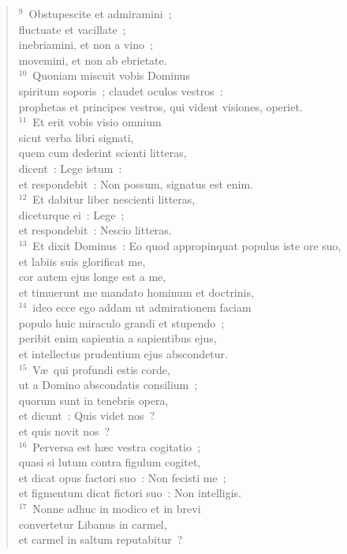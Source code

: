 \begin{flushleft}
\begin{verse}
${}^{9}$~Obstupescite et admiramini~;\\ fluctuate et vacillate~;\\ inebriamini, et non a vino~;\\ movemini, et non ab ebrietate.\\
${}^{10}$~Quoniam miscuit vobis Dominus\\ spiritum soporis~; claudet oculos vestros~:\\ prophetas et principes vestros, qui vident visiones, operiet.\\
${}^{11}$~Et erit vobis visio omnium\\ sicut verba libri signati,\\ quem cum dederint scienti litteras,\\ dicent~: Lege istum~:\\ et respondebit~: Non possum, signatus est enim.\\
${}^{12}$~Et dabitur liber nescienti litteras,\\ diceturque ei~: Lege~;\\ et respondebit~: Nescio litteras.\\
${}^{13}$~Et dixit Dominus~: Eo quod appropinquat populus iste ore suo,\\ et labiis suis glorificat me,\\ cor autem ejus longe est a me,\\ et timuerunt me mandato hominum et doctrinis,\\
${}^{14}$~ideo ecce ego addam ut admirationem faciam\\ populo huic miraculo grandi et stupendo~;\\ peribit enim sapientia a sapientibus ejus,\\ et intellectus prudentium ejus abscondetur.\\
${}^{15}$~V\ae\ qui profundi estis corde,\\ ut a Domino abscondatis consilium~;\\ quorum sunt in tenebris opera,\\ et dicunt~: Quis videt nos~?\\ et quis novit nos~?\\
${}^{16}$~Perversa est h\ae c vestra cogitatio~;\\ quasi si lutum contra figulum cogitet,\\ et dicat opus factori suo~: Non fecisti me~;\\ et figmentum dicat fictori suo~: Non intelligis.\\
${}^{17}$~Nonne adhuc in modico et in brevi\\ convertetur Libanus in carmel,\\ et carmel in saltum reputabitur~?\\

\end{verse}
\end{flushleft}

